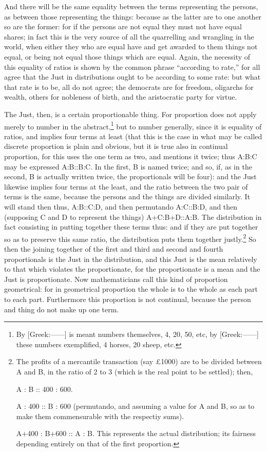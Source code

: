 And there will be the same equality between the terms representing the persons,
as between those representing the things: because as the latter are to one
another so are the former: for if the persons are not equal they must not have
equal shares; in fact this is the very source of all the quarrelling and
wrangling in the world, when either they who are equal have and get awarded to
them things not equal, or being not equal those things which are equal. Again,
the necessity of this equality of ratios is shown by the common phrase
“according to rate,” for all agree that the Just in distributions
ought to be according to some rate: but what that rate is to be, all do not
agree; the democrats are for freedom, oligarchs for wealth, others for
nobleness of birth, and the aristocratic party for virtue.

The Just, then, is a certain proportionable thing. For proportion does not
apply merely to number in the abstract,\footnote{By [Greek:——] is meant numbers themselves, 4, 20, 50, etc, by
[Greek:——] these numbers exemplified, 4 horses, 20 sheep, etc.}
but to number generally, since it is equality of ratios, and implies four terms
at least (that this is the case in what may be called discrete proportion is
plain and obvious, but it is true also in continual proportion, for this uses
the one term as two, and mentions it twice; thus A:B:C may be expressed
A:B::B:C. In the first, B is named twice; and so, if, as in the second, B is
actually written twice, the proportionals will be four): and the Just likewise
implies four terms at the least, and the ratio between the two pair of terms is
the same, because the persons and the things are divided similarly. It will
stand then thus, A:B::C:D, and then permutando A:C::B:D, and then (supposing C
and D to represent the things) A+C:B+D::A:B. The distribution in fact
consisting in putting together these terms thus: and if they are put together
so as to preserve this same ratio, the distribution puts them together
justly.\footnote{The profits of a mercantile transaction (say £1000) are to be divided between A
and B, in the ratio of 2 to 3 (which is the real point to be settled);
then,

A : B :: 400 : 600.

A : 400 :: B : 600 (permutando, and assuming a value for A and B, so as to
make them commensurable with the respectiy sums).

A+400 : B+600 :: A : B. This represents the actual distribution; its
fairness depending entirely on that of the first proportion.}
So then the joining together of the first and third and second and fourth
proportionals is the Just in the distribution, and this Just is the mean
relatively to that which violates the proportionate, for the proportionate is a
mean and the Just is proportionate. Now mathematicians call this kind of
proportion geometrical: for in geometrical proportion the whole is to the whole
as each part to each part. Furthermore this proportion is not continual,
because the person and thing do not make up one term.

